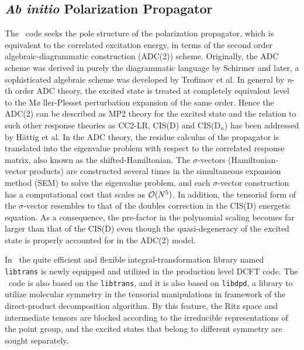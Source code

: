 \subsection{\textit{Ab initio} Polarization Propagator} \label{adc}

The \PSIadc\ code seeks the pole structure of the polarization
propagator, which is equivalent to the correlated excitation energy,
in terms of the second order algebraic-diagrammatic construction
(ADC(2)) scheme.  Originally, the ADC scheme was derived in purely
the diagrammatic language by Schirmer \cite{Schirmer:1982} and later,
a sophisticated algebraic scheme was developed \cite{Trofimov:2006}
by Trofimov et al. In general by \textit{n}-th order ADC theory, the
excited state is treated at completely equivalent level to the M\o
ller-Plesset perturbation expansion of the same order. Hence the ADC(2)
can be described as MP2 theory for the excited state and the relation
to such other response theories as CC2-LR, CIS(D) and CIS(D${}_n$) has
been addressed \cite{Haettig:2002} by H\"attig et al.  In the ADC theory,
the residue calculus of the propagator is translated into the eigenvalue
problem with respect to the correlated response matrix, also known as the
shifted-Hamiltonian. The $\sigma$-vectors (Hamiltonian-vector products)
are constructed several times in the simultaneous expansion method (SEM)
to solve the eigenvalue problem, and each $\sigma$-vector construction
has a computational cost that scales as ${\cal{O}}(N^5)$. In addition,
the tensorial form of the $\sigma$-vector resembles to that of the
doubles correction in the CIS(D) energetic equation. As a consequence,
the pre-factor in the polynomial scaling becomes far larger than that
of the CIS(D) even though the quasi-degeneracy of the excited state is
properly accounted for in the ADC(2) model.

In \PSIfour\ the quite efficient and flexible integral-transformation
library named {\tt libtrans} is newly equipped and utilized in the
production level DCFT code. The \PSIadc\ code is also based on the
{\tt libtrans}, and it is also based on {\tt libdpd}, a library to
utilize molecular symmetry in the tensorial manipulations in framework
of the direct-product decomposition algorithm. By this feature, the Ritz
space and intermediate tensors are blocked according to the irreducible
representations of the point group, and the excited states that belong
to different symmetry are sought separately.

